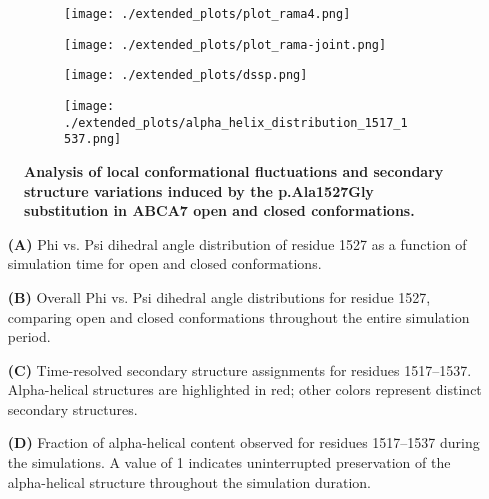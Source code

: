 \begin{figure}[H]
    \begin{subfigure}[t]{.6\textwidth}
        \caption{}
        \texttt{[image: ./extended\_plots/plot\_rama4.png]}        
    \end{subfigure}
    \begin{subfigure}[t]{.4\textwidth}
        \caption{}
        \texttt{[image: ./extended\_plots/plot\_rama-joint.png]}        
    \end{subfigure}
    \begin{subfigure}[t]{.5\textwidth}
        \caption{}
        \texttt{[image: ./extended\_plots/dssp.png]}        
    \end{subfigure}
    \begin{subfigure}[t]{.45\textwidth}
        \caption{}
        \texttt{[image: ./extended\_plots/alpha\_helix\_distribution\_1517\_1537.png]}        
    \end{subfigure}
    \caption{
        \textbf{Analysis of local conformational fluctuations and secondary structure variations induced by the p.Ala1527Gly substitution in ABCA7 open and closed conformations.}\\
        }
        \label{fig:md_simulations_2}
    \end{figure}
    \begin{itemize}
        \item[\textbf{(A)}] Phi vs. Psi dihedral angle distribution of residue 1527 as a function of simulation time for open and closed conformations.
        \item[\textbf{(B)}] Overall Phi vs. Psi dihedral angle distributions for residue 1527, comparing open and closed conformations throughout the entire simulation period.
        \item[\textbf{(C)}] Time-resolved secondary structure assignments for residues 1517–1537. Alpha-helical structures are highlighted in red; other colors represent distinct secondary structures.
        \item[\textbf{(D)}] Fraction of alpha-helical content observed for residues 1517–1537 during the simulations. A value of 1 indicates uninterrupted preservation of the alpha-helical structure throughout the simulation duration.
    \end{itemize}

